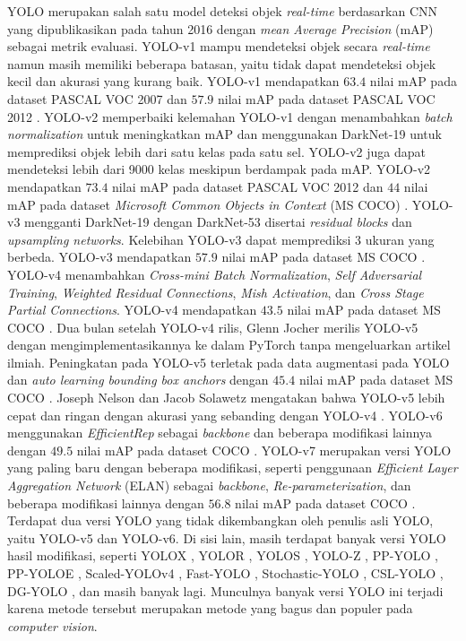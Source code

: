     YOLO merupakan salah satu model deteksi objek \textit{real-time} berdasarkan CNN yang dipublikasikan pada tahun 2016 dengan \textit{mean Average Precision} (mAP) sebagai metrik evaluasi. YOLO-v1 mampu mendeteksi objek secara \textit{real-time} namun masih memiliki beberapa batasan, yaitu tidak dapat mendeteksi objek kecil dan akurasi yang kurang baik. YOLO-v1 mendapatkan $63.4$ nilai mAP pada dataset PASCAL VOC 2007 dan $57.9$ nilai mAP pada dataset PASCAL VOC 2012 \citep{Redmon2016a}. YOLO-v2 memperbaiki kelemahan YOLO-v1 dengan menambahkan \textit{batch normalization} untuk meningkatkan mAP dan menggunakan DarkNet-19 untuk memprediksi objek lebih dari satu kelas pada satu sel. YOLO-v2 juga dapat mendeteksi lebih dari 9000 kelas meskipun berdampak pada mAP. YOLO-v2 mendapatkan $73.4$ nilai mAP pada dataset PASCAL VOC 2012 dan $44$ nilai mAP pada dataset \textit{Microsoft Common Objects in Context} (MS COCO) \citep{Redmon2017}. YOLO-v3 mengganti DarkNet-19 dengan DarkNet-53 disertai \textit{residual blocks} dan \textit{upsampling networks}. Kelebihan YOLO-v3 dapat memprediksi 3 ukuran yang berbeda. YOLO-v3 mendapatkan $57.9$ nilai mAP pada dataset MS COCO \citep{Redmon2018}. YOLO-v4 menambahkan \textit{Cross-mini Batch Normalization}, \textit{Self Adversarial Training}, \textit{Weighted Residual Connections}, \textit{Mish Activation}, dan \textit{Cross Stage Partial Connections}. YOLO-v4 mendapatkan $43.5$ nilai mAP pada dataset MS COCO \citep{Bochkovskiy2020}. Dua bulan setelah YOLO-v4 rilis, Glenn Jocher merilis YOLO-v5 dengan mengimplementasikannya ke dalam PyTorch tanpa mengeluarkan artikel ilmiah. Peningkatan pada YOLO-v5 terletak pada data augmentasi pada YOLO dan \textit{auto learning bounding box anchors} dengan $45.4$ nilai mAP pada dataset MS COCO \citep{Jocher2020}. Joseph Nelson dan Jacob Solawetz mengatakan bahwa YOLO-v5 lebih cepat dan ringan dengan akurasi yang sebanding dengan YOLO-v4 \citep{Nelson2020}. YOLO-v6 menggunakan \textit{EfficientRep} sebagai \textit{backbone} dan beberapa modifikasi lainnya dengan $49.5$ nilai mAP pada dataset COCO \citep{Li2022}. YOLO-v7 merupakan versi YOLO yang paling baru dengan beberapa modifikasi, seperti penggunaan \textit{Efficient Layer Aggregation Network} (ELAN) sebagai \textit{backbone}, \textit{Re-parameterization}, dan beberapa modifikasi lainnya dengan $56.8$ nilai mAP pada dataset COCO \citep{Wang2022}. Terdapat dua versi YOLO yang tidak dikembangkan oleh penulis asli YOLO, yaitu YOLO-v5 dan YOLO-v6. Di sisi lain, masih terdapat banyak versi YOLO hasil modifikasi, seperti YOLOX \citep{Ge2021}, YOLOR \citep{Zhu2021a}, YOLOS \citep{Wolf2020a}, YOLO-Z \citep{Benjumea2021}, PP-YOLO \citep{Long2020}, PP-YOLOE \citep{Xu2022}, Scaled-YOLOv4 \citep{ScaledYOLOv4Wang2021}, Fast-YOLO \citep{Shaifee2017}, Stochastic-YOLO \cite{Azevedo2020}, CSL-YOLO \citep{Zhang2021b}, DG-YOLO \citep{Liu2020}, dan masih banyak lagi. Munculnya banyak versi YOLO ini terjadi karena metode tersebut merupakan metode yang bagus dan populer pada \textit{computer vision}.

